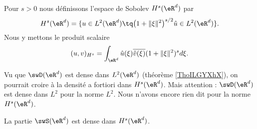 \begin{definition}     \label{DEFooWEAQooAIWBwx}
    Pour \( s>0\) nous définissons l'espace de Sobolev \( H^s(\eR^d)\) par
    \begin{equation}
        H^s(\eR^d)=\{ u\in L^2(\eR^d)\tq  \big( 1+\| \xi \|^2 \big)^{s/2}\hat u\in L^2(\eR^d)  \}.
    \end{equation}
    Nous y mettons le produit scalaire
    \begin{equation}
        (u,v)_{H^s}=\int_{\eR^d}\hat u(\xi)\overline{ \hat v(\xi) }(1+\| \xi \|^2)^sd\xi.
    \end{equation}
\end{definition}

\begin{normaltext}
    Vu que \( \swD(\eR^d)\) est dense dans \( L^2(\eR^d)\) (théorème \ref{ThoILGYXhX}), on pourrait croire à la densité a fortiori dans \( H^s(\eR^d)\). Mais attention : \( \swD(\eR^d)\) est dense dans \( L^2\) pour la norme \( L^2\). Nous n'avons encore rien dit pour la norme \( H^s(\eR^d)\).
\end{normaltext}

\begin{proposition}      \label{PROPooMKAFooKDNTbO}
    La partie \( \swS(\eR^d)\) est dense dans \( H^s(\eR^d)\).
\end{proposition}


